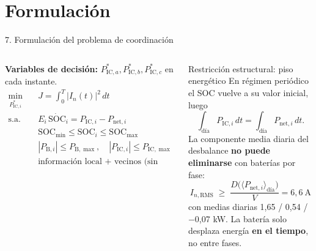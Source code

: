 \documentclass[aspectratio=169,11pt]{beamer}
\newcommand{\Pic}[1]{P_{\mathrm{IC},#1}}
\newcommand{\Picr}[1]{P^{*}_{\mathrm{IC},#1}}
\newcommand{\Pnet}[1]{P_{\mathrm{net},#1}}
\newcommand{\Pbat}[1]{P_{\mathrm{B},#1}}
\newcommand{\SOC}[1]{\mathrm{SOC}_{#1}}
\begin{document}
\section{Formulación}
\begin{frame}{7. Formulación del problema de coordinación}
  \begin{columns}[T]
    \textbf{Variables de decisión:} $\Picr{a},\Picr{b},\Picr{c}$ en cada instante.
    \begin{align*}
      \min_{\Picr{i}}\quad & J=\int_0^T |I_n(t)|^2\,dt \\
      \text{s.a.}\quad & E_i\,\dot{\mathrm{SOC}}_i = \Pic{i}-\Pnet{i} \\
      & \mathrm{SOC}_{\min}\le\SOC{i}\le\mathrm{SOC}_{\max} \\
      & |\Pbat{i}|\le P_{\mathrm{B},\max},\quad |\Pic{i}|\le P_{\mathrm{IC},\max} \\
      & \text{información local + vecinos (sin coordinador central)}
    \end{align*}
    \begin{alertblock}{Restricción estructural: piso energético}
      \footnotesize En régimen periódico el SOC vuelve a su valor inicial, luego
      \[\textstyle\int_{\mathrm{día}}\Pic{i}\,dt=\int_{\mathrm{día}}\Pnet{i}\,dt .\]
      La componente media diaria del desbalance \textbf{no puede eliminarse} con baterías por fase:
      \[ I_{n,\mathrm{RMS}} \;\ge\; \frac{D\big(\langle\Pnet{i}\rangle_{\mathrm{día}}\big)}{V} = 6{,}6\ \mathrm{A}\]
      {\scriptsize con medias diarias 1{,}65 / 0{,}54 / $-$0{,}07 kW.}
      La batería solo desplaza energía \textbf{en el tiempo}, no entre fases.
    \end{alertblock}
  \end{columns}
\end{frame}
\end{document}
